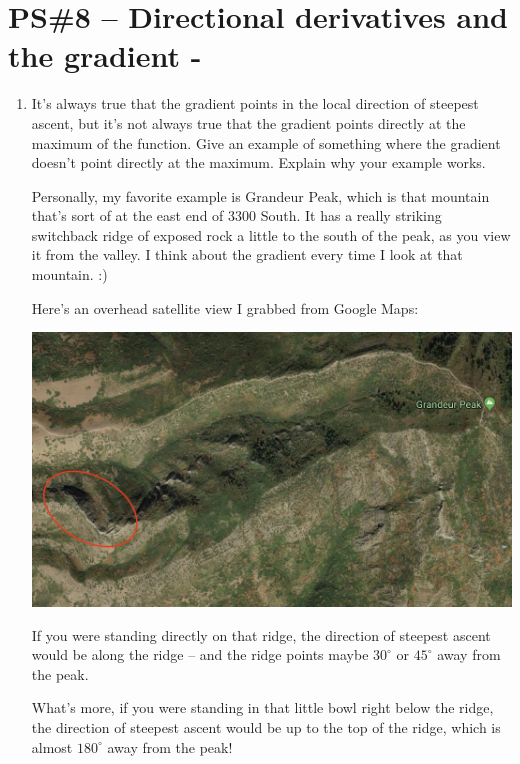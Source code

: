 


%


\allowdisplaybreaks
\section{PS\#8 -- Directional derivatives and the gradient -  }

\begin{enumerate}[leftmargin=0pt]
    
    \item It's always true that the gradient points in the local direction of steepest ascent, but it's not always true that the gradient points directly at the maximum of the function. Give an example of something where the gradient doesn't point directly at the maximum. Explain why your example works. 
    
    \begin{red}
    Personally, my favorite example is Grandeur Peak, which is that mountain that's sort of at the east end of 3300 South. It has a really striking switchback ridge of exposed rock a little to the south of the peak, as you view it from the valley. I think about the gradient every time I look at that mountain. :) 
    
    Here's an overhead satellite view I grabbed from Google Maps:
    
    \includegraphics[width=\textwidth]{../images/grandeur.png}
    
    If you were standing directly on that ridge, the direction of steepest ascent would be along the ridge -- and the ridge points maybe $30^\circ$ or $45^\circ$ away from the peak.
    
    What's more, if you were standing in that little bowl right below the ridge, the direction of steepest ascent would be up to the top of the ridge, which is almost $180^\circ$ away from the peak!
    \end{red}
    

\end{enumerate}

